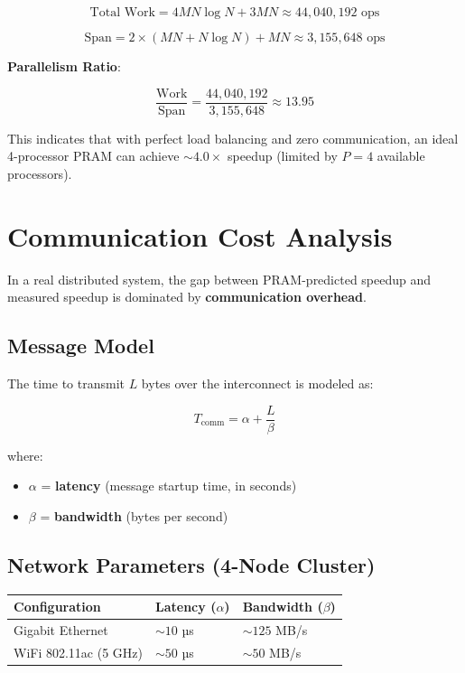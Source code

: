 \documentclass[11pt,a4paper]{article}
\begin{document}
\begin{equation}
\text{Total Work} = 4MN \log N + 3MN \approx 44{,}040{,}192 \text{ ops}
\end{equation}

\begin{equation}
\text{Span} = 2 \times (MN + N \log N) + MN \approx 3{,}155{,}648 \text{ ops}
\end{equation}

\textbf{Parallelism Ratio}:

\[
\frac{\text{Work}}{\text{Span}} = \frac{44{,}040{,}192}{3{,}155{,}648} \approx 13.95
\]

This indicates that with perfect load balancing and zero communication, an ideal 4-processor PRAM can achieve $\sim 4.0\times$ speedup (limited by $P=4$ available processors).

\section{Communication Cost Analysis}

In a real distributed system, the gap between PRAM-predicted speedup and measured speedup is dominated by \textbf{communication overhead}.

\subsection{Message Model}

The time to transmit $L$ bytes over the interconnect is modeled as:

\[
T_{\text{comm}} = \alpha + \frac{L}{\beta}
\]

where:
\begin{itemize}
    \item $\alpha$ = \textbf{latency} (message startup time, in seconds)
    \item $\beta$ = \textbf{bandwidth} (bytes per second)
\end{itemize}

\subsection{Network Parameters (4-Node Cluster)}

\begin{table}[h]
    \centering
    \begin{tabular}{ll}
        \hline
        \textbf{Configuration} & \textbf{Latency ($\alpha$)} & \textbf{Bandwidth ($\beta$)} \\
        \hline
        Gigabit Ethernet & $\sim 10$ µs & $\sim 125$ MB/s \\
        WiFi 802.11ac (5 GHz) & $\sim 50$ µs & $\sim 50$ MB/s \\
        \hline
    \end{tabular}
\end{table}
\end{document}
